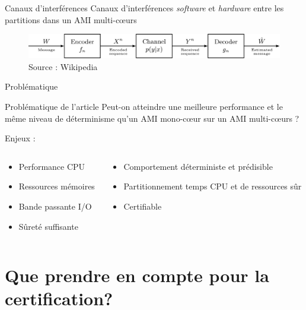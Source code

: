 \documentclass{beamer}
\begin{document}
\begin{frame}{Canaux d'interférences}
	Canaux d'interférences \textit{software} et \textit{hardware} entre les partitions
	dans un AMI multi-cœurs
	\bigskip
	\begin{figure}
		\centering
		\includegraphics[width=\linewidth]{Interference_channel_model.pdf} 
		\caption{Source : Wikipedia \cite{wiki:Information_theory}}
		\label{fig:Interference_channel_model}
	\end{figure}
\end{frame}


\begin{frame}{Problématique} 

	\begin{block}{Problématique de l'article}
	Peut-on atteindre une meilleure performance et le même niveau de déterminisme qu'un AMI mono-cœur sur un 
	AMI multi-cœurs ?
	\end{block}
    \pause
	  Enjeux :
  \begin{columns}
	  \begin{column}{0.45\textwidth}
		  \begin{itemize}
		  	\item Performance CPU 
			\item Ressources mémoires
			\item Bande passante I/O 
			\item Sûreté suffisante
		  \end{itemize}
	  \end{column}
	  \begin{column}{0.45\textwidth}
		  \begin{itemize}
			  \item Comportement déterministe et prédisible
		      \item Partitionnement temps CPU et de ressources sûr
			  \item Certifiable
		  \end{itemize}
	  \end{column}
  \end{columns}
 
\end{frame}

\section[Certification]{Que prendre en compte pour la certification?}%
\label{sec:certification}
 
\end{document}
